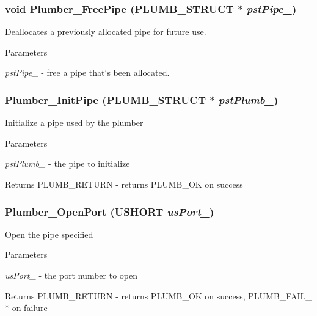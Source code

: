 \subsubsection[{Plumber\_\-FreePipe}]{\setlength{\rightskip}{0pt plus 5cm}void Plumber\_\-FreePipe ({\bf PLUMB\_\-STRUCT} $\ast$ {\em pstPipe\_\-})}\label{plumber_8h_ad136887c82a972feec4d50e4a8551ad7}
Deallocates a previously allocated pipe for future use.


\begin{DoxyParams}{Parameters}
\item[{\em pstPipe\_\-}]-\/ free a pipe that`s been allocated. \end{DoxyParams}
\subsubsection[{Plumber\_\-InitPipe}]{ Plumber\_\-InitPipe ({\bf PLUMB\_\-STRUCT} $\ast$ {\em pstPlumb\_\-})}\label{plumber_8h_a16ed72c8d0b67b11feffb236041148d4}
Initialize a pipe used by the plumber


\begin{DoxyParams}{Parameters}
\item[{\em pstPlumb\_\-}]-\/ the pipe to initialize \end{DoxyParams}
\begin{DoxyReturn}{Returns}
PLUMB\_\-RETURN -\/ returns PLUMB\_\-OK on success 
\end{DoxyReturn}
\subsubsection[{Plumber\_\-OpenPort}]{ Plumber\_\-OpenPort (USHORT {\em usPort\_\-})}\label{plumber_8h_a829e3f4d8ece685ef73d4c23232d1037}
Open the pipe specified


\begin{DoxyParams}{Parameters}
\item[{\em usPort\_\-}]-\/ the port number to open \end{DoxyParams}
\begin{DoxyReturn}{Returns}
PLUMB\_\-RETURN -\/ returns PLUMB\_\-OK on success, PLUMB\_\-FAIL\_\-$\ast$ on failure 
\end{DoxyReturn}

